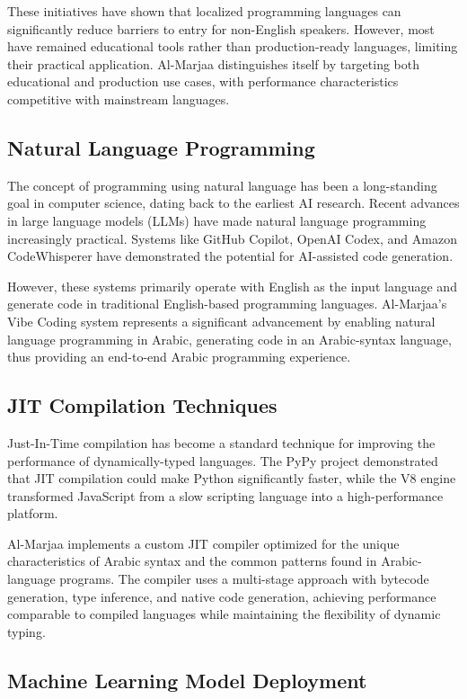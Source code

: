 \documentclass[11pt,a4paper]{article}
\begin{document}
These initiatives have shown that localized programming languages can significantly reduce barriers to entry for non-English speakers. However, most have remained educational tools rather than production-ready languages, limiting their practical application. Al-Marjaa distinguishes itself by targeting both educational and production use cases, with performance characteristics competitive with mainstream languages.

\subsection{Natural Language Programming}

The concept of programming using natural language has been a long-standing goal in computer science, dating back to the earliest AI research. Recent advances in large language models (LLMs) have made natural language programming increasingly practical. Systems like GitHub Copilot, OpenAI Codex, and Amazon CodeWhisperer have demonstrated the potential for AI-assisted code generation.

However, these systems primarily operate with English as the input language and generate code in traditional English-based programming languages. Al-Marjaa's Vibe Coding system represents a significant advancement by enabling natural language programming in Arabic, generating code in an Arabic-syntax language, thus providing an end-to-end Arabic programming experience.

\subsection{JIT Compilation Techniques}

Just-In-Time compilation has become a standard technique for improving the performance of dynamically-typed languages. The PyPy project demonstrated that JIT compilation could make Python significantly faster, while the V8 engine transformed JavaScript from a slow scripting language into a high-performance platform.

Al-Marjaa implements a custom JIT compiler optimized for the unique characteristics of Arabic syntax and the common patterns found in Arabic-language programs. The compiler uses a multi-stage approach with bytecode generation, type inference, and native code generation, achieving performance comparable to compiled languages while maintaining the flexibility of dynamic typing.

\subsection{Machine Learning Model Deployment}
\end{document}
